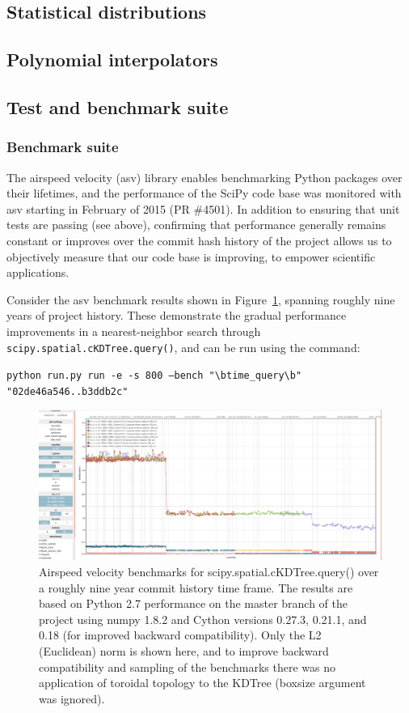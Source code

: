 \documentclass[fleqn,10pt]{wlscirep}
\begin{document}
\subsection*{Statistical distributions}

\subsection*{Polynomial interpolators}

\subsection*{Test and benchmark suite}

    \subsubsection*{Benchmark suite}

    The airspeed velocity (asv) library enables benchmarking Python packages over their lifetimes, and the performance of the SciPy
    code base was monitored with asv starting in February of 2015 (PR \#4501). In addition to ensuring that unit tests are passing (see above),
    confirming that performance generally remains constant or improves over the commit hash history of the project allows us to objectively
    measure that our code base is improving, to empower scientific applications.

    Consider the asv benchmark results shown in Figure~\ref{fig:asvbench}, spanning roughly nine years of project history. These demonstrate the gradual performance
    improvements in a nearest-neighbor search through \texttt{scipy.spatial.cKDTree.query()}, and can be run using the command:


    \texttt{python run.py run -e -s 800 --bench "\textbackslash btime\_query\textbackslash b" "02de46a546..b3ddb2c"}

    \begin{figure}[H]
        \centering
        \includegraphics[width=\textwidth]{static/asv_time_query_ckdtree}
        \caption{Airspeed velocity benchmarks for scipy.spatial.cKDTree.query() over a roughly nine year commit history time frame. The results are based on Python 2.7 performance on the master branch of the project using numpy 1.8.2 and Cython versions 0.27.3, 0.21.1, and 0.18 (for improved backward compatibility). Only the L2 (Euclidean) norm is shown here, and to improve backward compatibility and sampling of the benchmarks there was no application of toroidal topology to the KDTree (boxsize argument was ignored).}
        \label{fig:asvbench}
    \end{figure}
\end{document}
